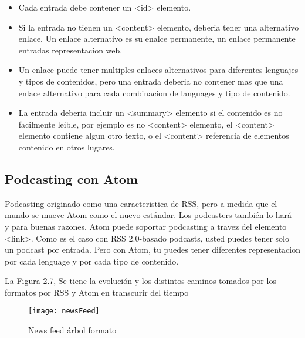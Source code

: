 \begin{itemize}

\item Cada entrada debe contener un <id> elemento.
\item Si la entrada no tienen un <content> elemento, deberia tener una alternativo enlace. Un enlace alternativo es su enalce
permanente, un enlace permanente entradas representacion web.
\item Un enlace puede tener multiples enlaces alternativos para diferentes lenguajes y tipos de contenidos, pero una entrada
deberia no contener mas que una enlace alternativo para cada combinacion de languages y tipo de contenido.
\item La entrada deberia incluir un <summary> elemento si el contenido es no facilmente leible, por ejemplo es no <content> 
elemento, el <content> elemento contiene algun otro texto, o el <content> referencia de elementos contenido en otros lugares.\cite{johnson2006rss}

\end{itemize}

\subsection{Podcasting con Atom}


Podcasting originado como una caracteristica de RSS, pero a medida que el mundo se mueve Atom como el nuevo estándar.
Los podcasters también lo hará - y para buenas razones. Atom puede soportar podcasting a travez del elemento <link>.
Como es el caso con RSS 2.0-basado podcasts, usted puedes tener solo un podcast por entrada. Pero con Atom, tu puedes
tener diferentes representacion por cada lenguage y por cada tipo de contenido.\cite{johnson2006rss}

La Figura 2.7, Se tiene la evoluci\'{o}n y los distintos caminos tomados por los formatos por RSS y Atom en transcurir del
tiempo

\begin{figure}[!htb]
\centering
\texttt{[image: newsFeed]}
\caption{News feed árbol formato}
\end{figure}
